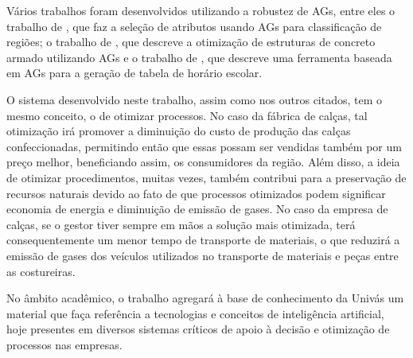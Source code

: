 \par Vários trabalhos foram desenvolvidos utilizando a robustez de AGs, entre
eles o trabalho de , que faz a seleção de
atributos usando AGs para classificação de
regiões; o trabalho de , que descreve a
otimização de estruturas de concreto armado utilizando AGs e 
o trabalho de , que descreve uma ferramenta
baseada em AGs para a geração de tabela de horário escolar.

\par O sistema desenvolvido neste trabalho, assim como nos outros citados, 
tem o mesmo conceito, o de otimizar processos. No caso da fábrica de calças, 
tal otimização irá promover a diminuição do custo de produção das calças confeccionadas, 
permitindo então que essas possam ser vendidas também por um preço melhor, 
beneficiando assim, os consumidores da região. 
Além disso, a ideia de otimizar procedimentos, muitas vezes, também contribui
para a preservação de recursos naturais devido ao fato de que processos otimizados 
podem significar economia de energia e diminuição de emissão de gases. 
No caso da empresa de calças, se o gestor tiver sempre em mãos a solução mais otimizada, 
terá consequentemente um menor tempo de transporte de materiais, o que reduzirá a emissão de gases 
dos veículos utilizados no transporte de materiais e peças entre as costureiras.

\par No âmbito acadêmico, o trabalho agregará à base de conhecimento
da Univás um material que faça referência a tecnologias e conceitos de inteligência
artificial, hoje presentes em diversos sistemas críticos de apoio à
decisão e otimização de processos nas empresas.
